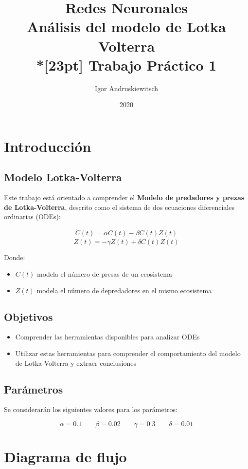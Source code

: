 \documentclass{article}
\title{%
Redes Neuronales \\
Análisis del modelo de Lotka Volterra \\*[23pt]
Trabajo Práctico 1 \\
}
\date{2020}
\author{Igor Andruskiewitsch}
\begin{document}
    \maketitle

\section{Introducción}

\subsection{Modelo Lotka-Volterra}

Este trabajo está orientado a comprender el {\bf Modelo de predadores y prezas de Lotka-Volterra}, descrito como el sistema de dos ecuaciones diferenciales ordinarias (ODEs):

$$ \dot{C}(t) = \alpha C(t) - \beta C(t) Z(t) $$
$$ \dot{Z}(t) = - \gamma Z(t) + \delta C(t) Z(t) $$

Donde:

\begin{itemize}
    \item {$ C(t) $ modela el número de presas de un ecosistema}
    \item {$ Z(t) $ modela el número de depredadores en el mismo ecosistema}
\end{itemize}

\subsection{Objetivos}

\begin{itemize}
    \item {Comprender las herramientas disponibles para analizar ODEs}
    \item {Utilizar estas herramientas para comprender el comportamiento del modelo de Lotka-Volterra y extraer conclusiones}
\end{itemize}

\subsection{Parámetros}

Se considerarán los siguientes valores para los parámetros:

$$ \alpha = 0.1 \qquad \beta = 0.02 \qquad \gamma = 0.3 \qquad \delta = 0.01 $$

\section{Diagrama de flujo}
\end{document}
